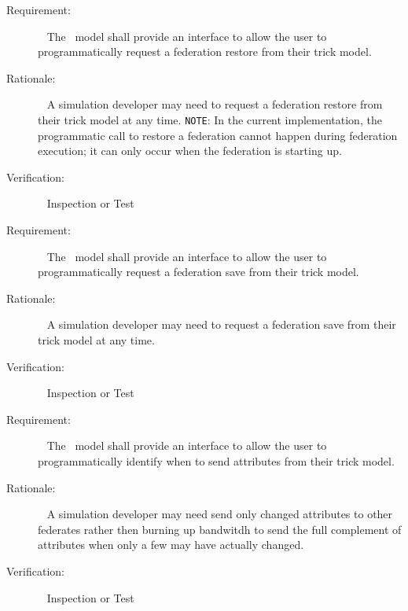 \documentclass[twoside,11pt,titlepage]{report}
\begin{document}
\label{reqt:federation_restore}
\begin{description}
  \item[Requirement:]\ \newline
    The \TrickHLA\ model shall provide an interface to allow the user to
    programmatically request a federation restore from their trick model.

  \item[Rationale:]\ \newline
    A simulation developer may need to request a federation restore from their
    trick model at any time.
    \newline
    {\tt NOTE}: In the current implementation, the programmatic call to
    restore a federation cannot happen during federation execution; it can only
    occur when the federation is starting up. 

  \item[Verification:]\ \newline
    Inspection or Test
\end{description}


\label{reqt:federation_save}
\begin{description}
  \item[Requirement:]\ \newline
    The \TrickHLA\ model shall provide an interface to allow the user to
    programmatically request a federation save from their trick model.

  \item[Rationale:]\ \newline
    A simulation developer may need to request a federation save from their
    trick model at any time.

  \item[Verification:]\ \newline
    Inspection or Test
\end{description}


\label{reqt:conditional_attribute_send}
\begin{description}
  \item[Requirement:]\ \newline
    The \TrickHLA\ model shall provide an interface to allow the user to
    programmatically identify when to send attributes from their trick model.

  \item[Rationale:]\ \newline
    A simulation developer may need send only changed attributes to other
    federates rather then burning up bandwitdh to send the full complement of
    attributes when only a few may have actually changed.

  \item[Verification:]\ \newline
    Inspection or Test
\end{description}
\end{document}
